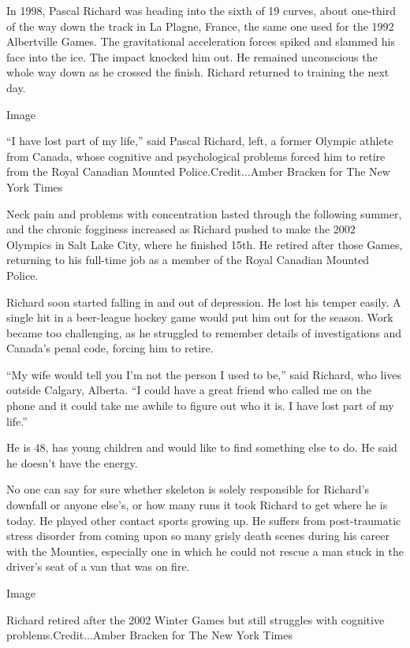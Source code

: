 In 1998, Pascal Richard was heading into the sixth of 19 curves, about
one-third of the way down the track in La Plagne, France, the same one
used for the 1992 Albertville Games. The gravitational acceleration
forces spiked and slammed his face into the ice. The impact knocked him
out. He remained unconscious the whole way down as he crossed the
finish. Richard returned to training the next day.

Image

``I have lost part of my life,'' said Pascal Richard, left, a former
Olympic athlete from Canada, whose cognitive and psychological problems
forced him to retire from the Royal Canadian Mounted
Police.Credit...Amber Bracken for The New York Times

Neck pain and problems with concentration lasted through the following
summer, and the chronic fogginess increased as Richard pushed to make
the 2002 Olympics in Salt Lake City, where he finished 15th. He retired
after those Games, returning to his full-time job as a member of the
Royal Canadian Mounted Police.

Richard soon started falling in and out of depression. He lost his
temper easily. A single hit in a beer-league hockey game would put him
out for the season. Work became too challenging, as he struggled to
remember details of investigations and Canada's penal code, forcing him
to retire.

``My wife would tell you I'm not the person I used to be,'' said
Richard, who lives outside Calgary, Alberta. ``I could have a great
friend who called me on the phone and it could take me awhile to figure
out who it is. I have lost part of my life.''

He is 48, has young children and would like to find something else to
do. He said he doesn't have the energy.

No one can say for sure whether skeleton is solely responsible for
Richard's downfall or anyone else's, or how many runs it took Richard to
get where he is today. He played other contact sports growing up. He
suffers from post-traumatic stress disorder from coming upon so many
grisly death scenes during his career with the Mounties, especially one
in which he could not rescue a man stuck in the driver's seat of a van
that was on fire.

Image

Richard retired after the 2002 Winter Games but still struggles with
cognitive problems.Credit...Amber Bracken for The New York Times

